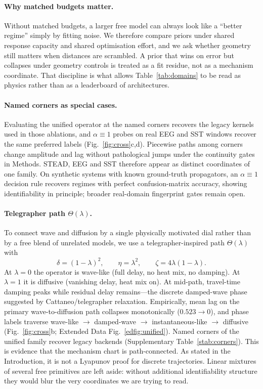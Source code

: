 \documentclass[twocolumn,10pt]{article}
\newcommand{\stead}{\textsc{STEAD}}
\begin{document}
\paragraph{Why matched budgets matter.}
Without matched budgets, a larger free model can always look like a ``better
regime'' simply by fitting noise. We therefore compare priors under shared
response capacity and shared optimisation effort, and we ask whether geometry
still matters when distances are scrambled. A prior that wins on error but
collapses under geometry controls is treated as a fit residue, not as a
mechanism coordinate. That discipline is what allows Table~\ref{tab:domains} to
be read as physics rather than as a leaderboard of architectures.

\paragraph{Named corners as special cases.}
Evaluating the unified operator at the named corners recovers the legacy
kernels used in those ablations, and \(\alpha\equiv1\) probes on real EEG and
SST windows recover the same preferred labels (Fig.~\ref{fig:cross}c,d). Piecewise
paths among corners change amplitude and lag without pathological jumps under
the continuity gates in Methods. \stead{}, EEG and SST therefore appear as
distinct coordinates of one family. On synthetic systems with known
ground-truth propagators, an \(\alpha\equiv1\) decision rule recovers regimes
with perfect confusion-matrix accuracy, showing identifiability in principle;
broader real-domain fingerprint gates remain open.

\paragraph{Telegrapher path \(\Theta(\lambda)\).}
To connect wave and diffusion by a single physically motivated dial rather than
by a free blend of unrelated models, we use a telegrapher-inspired path
\(\Theta(\lambda)\) with
\[
\delta=(1-\lambda)^{2},\qquad
\eta=\lambda^{2},\qquad
\zeta=4\lambda(1-\lambda).
\]
At \(\lambda=0\) the operator is wave-like (full delay, no heat mix, no
damping). At \(\lambda=1\) it is diffusive (vanishing delay, heat mix on). At
mid-path, travel-time damping peaks while residual delay remains---the discrete
damped-wave phase suggested by Cattaneo/telegrapher relaxation. Empirically,
mean lag on the primary wave-to-diffusion path collapses monotonically
(\(0.523\rightarrow0\)), and phase labels traverse wave-like \(\rightarrow\)
damped-wave \(\rightarrow\) instantaneous-like \(\rightarrow\)
diffusive (Fig.~\ref{fig:cross}b; Extended Data Fig.~\ref{edfig:unified}).
Named corners of the unified family recover legacy backends
(Supplementary Table~\ref{stab:corners}). This is
evidence that the mechanism chart is path-connected. As stated in the
Introduction, it is not a Lyapunov proof for discrete trajectories. Linear
mixtures of several free primitives are left aside: without additional
identifiability structure they would blur the very coordinates we are trying to
read.
\end{document}
